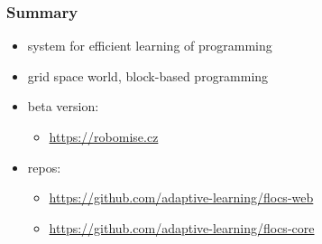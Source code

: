 \documentclass[xcolor=dvipsnames, 14pt]{beamer}
\begin{document}

\begin{frame}
\frametitle{Summary}
\begin{itemize}
\item system for efficient learning of programming %
\item grid space world, block-based programming
\item beta version:\\
  \begin{itemize}
  \item {\footnotesize \url{https://robomise.cz}}
  \end{itemize}
\item repos:\\
  \begin{itemize}
  \item {\footnotesize \url{https://github.com/adaptive-learning/flocs-web}}
  \item {\footnotesize \url{https://github.com/adaptive-learning/flocs-core}}
  \end{itemize}
\end{itemize}
\end{frame}
\end{document}

